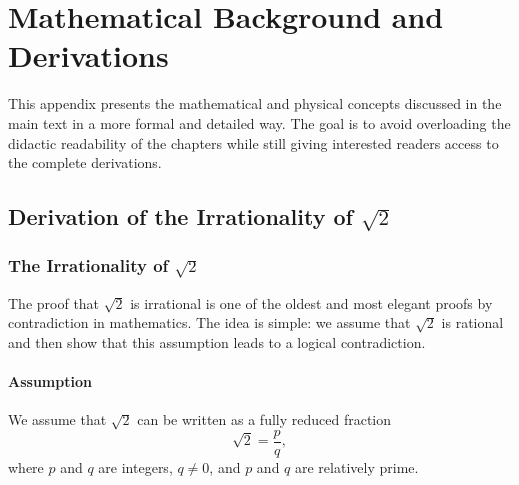 
\cleardoublepage
\appendix

\setcounter{chapter}{0}
\renewcommand{\thechapter}{\Alph{chapter}}
\renewcommand{\thesection}{\thechapter.\arabic{section}}
\renewcommand{\thesubsection}{\thesection.\arabic{subsection}}
\renewcommand{\thesubsubsection}{\thesubsection.\arabic{subsubsection}}

\renewcommand{\theHchapter}{app.\Alph{chapter}}
\renewcommand{\theHsection}{\theHchapter.\arabic{section}}
\renewcommand{\theHsubsection}{\theHsection.\arabic{subsection}}
\renewcommand{\theHsubsubsection}{\theHsubsection.\arabic{subsubsection}}

\chapter{Mathematical Background and Derivations}
\label{anhangA}

This appendix presents the mathematical and physical concepts discussed in the main text
in a more formal and detailed way. The goal is to avoid overloading the didactic readability
of the chapters while still giving interested readers
access to the complete derivations.

\section{Derivation of the Irrationality of $\sqrt{2}$}
\label{anhangA_wurzel2}

\subsection*{The Irrationality of \texorpdfstring{$\sqrt{2}$}{sqrt(2)}}

The proof that $\sqrt{2}$ is irrational is one of the oldest and
most elegant proofs by contradiction in mathematics.
The idea is simple: we assume that $\sqrt{2}$ is rational and then
show that this assumption leads to a logical contradiction.

\subsubsection*{Assumption}

We assume that $\sqrt{2}$ can be written as a fully reduced fraction
\[
\sqrt{2} = \frac{p}{q},
\]
where $p$ and $q$ are integers,
$q \neq 0$, and $p$ and $q$ are relatively prime.

